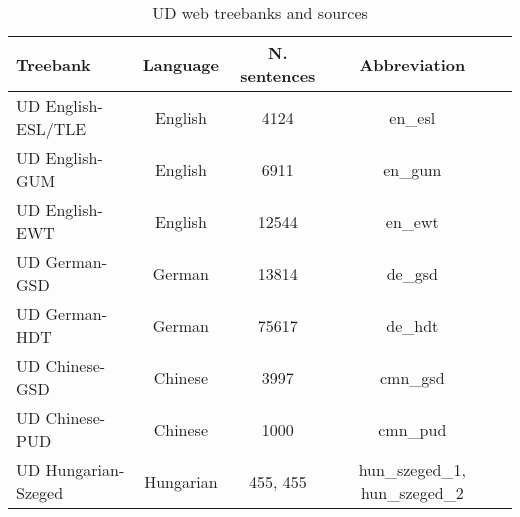 \begin{table*}
    \centering
    \begin{tabular}{lcccc}
        \hline
        \textbf{Treebank} & \textbf{Language} & \textbf{N. sentences} & \textbf{Abbreviation}\\
        \hline
        UD English-ESL/TLE & English & 4124 & en\_esl \\
        \hline
        UD English-GUM & English & 6911 & en\_gum \\
        \hline
        UD English-EWT & English & 12544 & en\_ewt \\
        \hline
        UD German-GSD & German & 13814 & de\_gsd \\
        \hline
        UD German-HDT & German & 75617 & de\_hdt \\
        \hline
        UD Chinese-GSD & Chinese & 3997 & cmn\_gsd \\
        \hline
        UD Chinese-PUD & Chinese & 1000 & cmn\_pud \\
        \hline
        UD Hungarian-Szeged & Hungarian & 455, 455 & hun\_szeged\_1, hun\_szeged\_2 \\
        \hline
    \end{tabular}
    \caption{UD web treebanks and sources}
    \label{tab:webdata}
\end{table*}